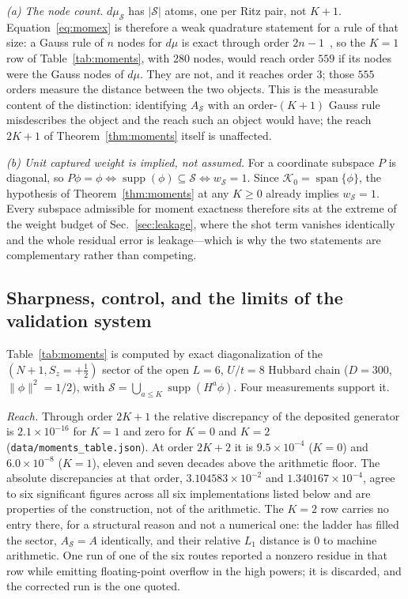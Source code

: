 \emph{(a) The node count.} $d\mu_{\mathcal S}$ has $|\mathcal S|$ atoms, one per Ritz pair, not $K+1$.
Equation~\eqref{eq:momex} is therefore a weak quadrature statement for a rule of that size: a Gauss
rule of $n$ nodes for $d\mu$ is exact through order $2n-1$~\cite{golub2010}, so the $K=1$ row of
Table~\ref{tab:moments}, with $280$ nodes, would reach order $559$ if its nodes were the Gauss nodes of
$d\mu$. They are not, and it reaches order $3$; those $555$ orders measure the distance between the
two objects. This is the measurable content of the distinction: identifying $A_{\mathcal S}$ with an order-$(K{+}1)$ Gauss rule misdescribes the
object and the reach such an object would have; the reach $2K+1$ of
Theorem~\ref{thm:moments} itself is unaffected.

\emph{(b) Unit captured weight is implied, not assumed.} For a coordinate subspace $P$ is diagonal, so
$P\phi=\phi\iff\operatorname{supp}(\phi)\subseteq\mathcal S\iff w_{\mathcal S}=1$. Since
$\mathcal K_0=\operatorname{span}\{\phi\}$, the hypothesis of Theorem~\ref{thm:moments} at any $K\ge0$
already implies $w_{\mathcal S}=1$. Every subspace admissible for moment exactness therefore sits at
the extreme of the weight budget of Sec.~\ref{sec:leakage}, where the shot term vanishes identically
and the whole residual error is leakage---which is why the two statements are complementary rather
than competing.

\subsection{Sharpness, control, and the limits of the validation system}
\label{app:moments:sharp}

Table~\ref{tab:moments} is computed by exact diagonalization of the $(N{+}1,S_z{=}{+}\tfrac12)$ sector of the
open $L=6$, $U/t=8$ Hubbard chain ($D=300$, $\lVert\phi\rVert^{2}=1/2$), with
$\mathcal S=\bigcup_{a\le K}\operatorname{supp}(H^{a}\phi)$. Four measurements support it.

\emph{Reach.} Through order $2K+1$ the relative discrepancy of the deposited generator is
$2.1\times10^{-16}$ for $K=1$ and zero for $K=0$ and $K=2$ (\texttt{data/moments\_table.json}). At order $2K{+}2$ it is $9.5\times10^{-4}$ ($K=0$) and
$6.0\times10^{-8}$ ($K=1$), eleven and seven decades above the arithmetic floor. The absolute
discrepancies at that order, $3.104583\times10^{-2}$ and $1.340167\times10^{-4}$, agree to six
significant figures across all six implementations listed below and are properties of the
construction, not of the arithmetic. The $K=2$ row carries no entry there, for a structural reason and
not a numerical one: the ladder has filled the sector, $A_{\mathcal S}=A$ identically, and their
relative $L_1$ distance is $0$ to machine arithmetic. One run of one of the six routes reported a nonzero residue in that row while emitting
floating-point overflow in the high powers; it is discarded, and the corrected run is the one quoted.

